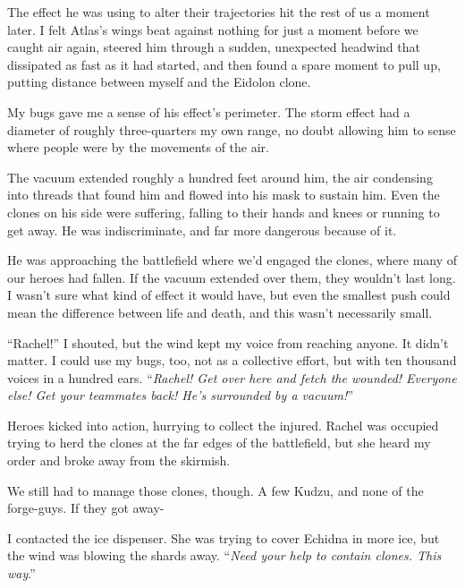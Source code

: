 The effect he was using to alter their trajectories hit the rest of us a moment later.  I felt Atlas's wings beat against nothing for just a moment before we caught air again, steered him through a sudden, unexpected headwind that dissipated as fast as it had started, and then found a spare moment to pull up, putting distance between myself and the Eidolon clone.



My bugs gave me a sense of his effect's perimeter.  The storm effect had a diameter of roughly three-quarters my own range, no doubt allowing him to sense where people were by the movements of the air.



The vacuum extended roughly a hundred feet around him, the air condensing into threads that found him and flowed into his mask to sustain him.  Even the clones on his side were suffering, falling to their hands and knees or running to get away.  He was indiscriminate, and far more dangerous because of it.



He was approaching the battlefield where we'd engaged the clones, where many of our heroes had fallen.  If the vacuum extended over them, they wouldn't last long.  I wasn't sure what kind of effect it would have, but even the smallest push could mean the difference between life and death, and this wasn't necessarily small.



``Rachel!'' I shouted, but the wind kept my voice from reaching anyone.  It didn't matter.  I could use my bugs, too, not as a collective effort, but with ten thousand voices in a hundred ears.  ``\emph{Rachel!  Get over here and fetch the wounded!  Everyone else!  Get your teammates back!  He's surrounded by a vacuum!}''



Heroes kicked into action, hurrying to collect the injured.  Rachel was occupied trying to herd the clones at the far edges of the battlefield, but she heard my order and broke away from the skirmish.



We still had to manage those clones, though.  A few Kudzu, and none of the forge-guys.  If they got away-



I contacted the ice dispenser.  She was trying to cover Echidna in more ice, but the wind was blowing the shards away.  ``\emph{Need your help to contain clones.  This way}.''



